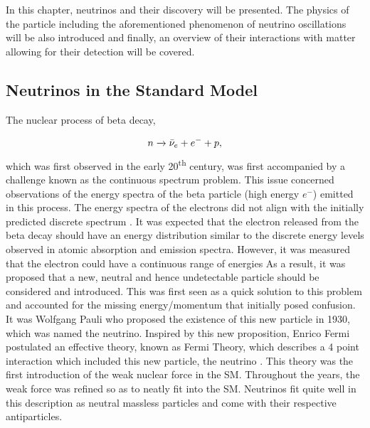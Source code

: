 \documentclass[11pt]{article}
\begin{document}
\vspace{10pt}

In this chapter, neutrinos and their discovery will be presented. The physics of the particle including the aforementioned phenomenon of neutrino oscillations will be also introduced and finally, an overview of their interactions with matter allowing for their detection will be covered. 


\subsection{Neutrinos in the Standard Model}
\setcounter{equation}{0}
\noindent The nuclear process of beta decay, 

\begin{equation}
    n \xrightarrow{} \Bar{\nu}_e + e^- + p,
\end{equation}
which was first observed in the early 20\textsuperscript{th} century, was first accompanied by a challenge known as the continuous spectrum problem. This issue concerned observations of the energy spectra of the beta particle (high energy $e^-$) emitted in this process. The energy spectra of the electrons did not align with the initially predicted discrete spectrum \cite{rutherford}. It was expected that the electron released from the beta decay should have an energy distribution similar to the discrete energy levels observed in atomic absorption and emission spectra. However, it was measured that the electron could have a continuous range of energies As a result, it was proposed that a new, neutral and hence undetectable particle should be considered and introduced. This was first seen as a quick solution to this problem and accounted for the missing energy/momentum that initially posed confusion. It was Wolfgang Pauli who proposed the existence of this new particle in 1930, which was named the neutrino. Inspired by this new proposition, Enrico Fermi postulated an effective theory, known as Fermi Theory, which describes a 4 point interaction which included this new particle, the neutrino \cite{Gavin}. This theory was the first introduction of the weak nuclear force in the SM. Throughout the years, the weak force was refined so as to neatly fit into the SM. Neutrinos fit quite well in this description as neutral massless particles and come with their respective antiparticles. 

\vspace{10pt}
\end{document}
